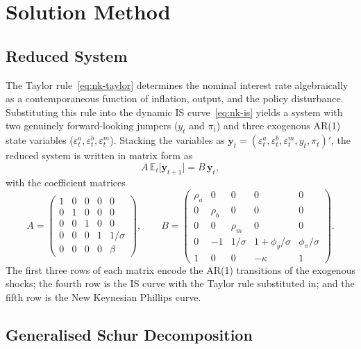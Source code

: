 \section{Solution Method}
\label{sec:solution}

\subsection{Reduced System}
\label{sec:solution_reduced}

The Taylor rule~\eqref{eq:nk-taylor} determines the nominal interest
rate algebraically as a contemporaneous function of inflation, output,
and the policy disturbance. Substituting this rule into the dynamic IS
curve~\eqref{eq:nk-is} yields a system with two genuinely
forward-looking jumpers ($y_{t}$ and $\pi_{t}$) and three exogenous
AR(1) state variables ($\varepsilon_{t}^{a},\varepsilon_{t}^{b},
\varepsilon_{t}^{m}$). Stacking the variables as
$\mathbf{y}_{t}=(\varepsilon_{t}^{a},\varepsilon_{t}^{b},
\varepsilon_{t}^{m},y_{t},\pi_{t})'$, the reduced system is written
in matrix form as
\begin{equation}
  A\,\mathbb{E}_{t}\bigl[\mathbf{y}_{t+1}\bigr]=B\,\mathbf{y}_{t},
  \label{eq:matrix-form}
\end{equation}
with the coefficient matrices
\begin{equation*}
  A=
  \begin{pmatrix}
    1 & 0 & 0 & 0 & 0 \\
    0 & 1 & 0 & 0 & 0 \\
    0 & 0 & 1 & 0 & 0 \\
    0 & 0 & 0 & 1 & 1/\sigma \\
    0 & 0 & 0 & 0 & \beta
  \end{pmatrix},
  \qquad
  B=
  \begin{pmatrix}
    \rho_{a} & 0 & 0 & 0 & 0 \\
    0 & \rho_{b} & 0 & 0 & 0 \\
    0 & 0 & \rho_{m} & 0 & 0 \\
    0 & -1 & 1/\sigma & 1+\phi_{y}/\sigma & \phi_{\pi}/\sigma \\
    1 & 0 & 0 & -\kappa & 1
  \end{pmatrix}.
\end{equation*}
The first three rows of each matrix encode the AR(1) transitions of
the exogenous shocks; the fourth row is the IS curve with the Taylor
rule substituted in; and the fifth row is the New Keynesian Phillips
curve.

\subsection{Generalised Schur Decomposition}
\label{sec:solution_klein}

